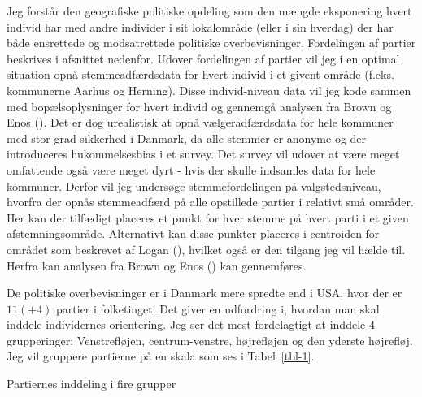 \documentclass[
  a4paper,
  DIV=11,
  numbers=noendperiod]{scrartcl}
\begin{document}
Jeg forstår den geografiske politiske opdeling som den mængde
eksponering hvert individ har med andre individer i sit lokalområde
(eller i sin hverdag) der har både ensrettede og modsatrettede politiske
overbevisninger. Fordelingen af partier beskrives i afsnittet nedenfor.
Udover fordelingen af partier vil jeg i en optimal situation opnå
stemmeadfærdsdata for hvert individ i et givent område (f.eks.
kommunerne Aarhus og Herning). Disse individ-niveau data vil jeg kode
sammen med bopælsoplysninger for hvert individ og gennemgå analysen fra
Brown og Enos (). Det er dog urealistisk
at opnå vælgeradfærdsdata for hele kommuner med stor grad sikkerhed i
Danmark, da alle stemmer er anonyme og der introduceres hukommelsesbias
i et survey. Det survey vil udover at være meget omfattende også være
meget dyrt - hvis der skulle indsamles data for hele kommuner. Derfor
vil jeg undersøge stemmefordelingen på valgstedsniveau, hvorfra der
opnås stemmeadfærd på alle opstillede partier i relativt små områder.
Her kan der tilfædigt placeres et punkt for hver stemme på hvert parti i
et given afstemningsområde. Alternativt kan disse punkter placeres i
centroiden for området som beskrevet af Logan
(), hvilket også er den tilgang jeg vil
hælde til. Herfra kan analysen fra Brown og Enos
() kan gennemføres.

De politiske overbevisninger er i Danmark mere spredte end i USA, hvor
der er \(11 (+4)\) partier i folketinget. Det giver en udfordring i,
hvordan man skal inddele individernes orientering. Jeg ser det mest
fordelagtigt at inddele \(4\) grupperinger; Venstrefløjen,
centrum-venstre, højrefløjen og den yderste højrefløj. Jeg vil gruppere
partierne på en skala som ses i Tabel~\ref{tbl-1}.

\begin{table}

\caption{\label{tbl-1}Partiernes inddeling i fire grupper}


\end{table}%
\end{document}
